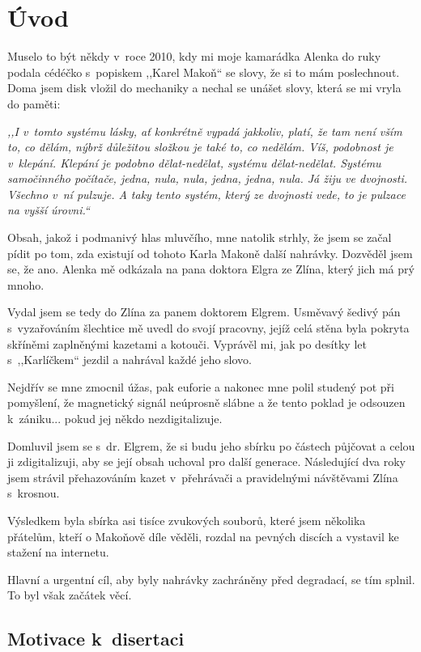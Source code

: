 \chapter{Úvod}
\label{kap:uvod}

Muselo to být někdy v~roce 2010, kdy mi moje kamarádka Alenka do ruky podala
cédéčko s~popiskem ,,Karel Makoň`` se slovy, že si to mám poslechnout. Doma jsem
disk vložil do mechaniky a nechal se unášet slovy, která se mi vryla do paměti:

{\em ,,I v~tomto systému lásky, ať konkrétně vypadá jakkoliv, platí, že tam není
vším to, co dělám, nýbrž důležitou složkou je také to, co nedělám. Víš,
podobnost je v~klepání. Klepání je podobno dělat-nedělat, systému dělat-nedělat.
Systému samočinného počítače, jedna, nula, nula, jedna, jedna, nula. Já
žiju ve dvojnosti. Všechno v~ní pulzuje. A taky tento systém, který ze dvojnosti
vede, to je pulzace na vyšší úrovni.``}

Obsah, jakož i podmanivý hlas mluvčího, mne natolik strhly, že jsem se začal
pídit po tom, zda existují od tohoto Karla Makoně další nahrávky. Dozvěděl jsem
se, že ano. Alenka mě odkázala na pana doktora Elgra ze Zlína, který jich má
prý mnoho.

Vydal jsem se tedy do Zlína za panem doktorem Elgrem. Usměvavý šedivý pán
s~vyzařováním šlechtice mě uvedl do svojí pracovny, jejíž celá stěna byla
pokryta skříněmi zaplněnými kazetami a kotouči. Vyprávěl mi, jak po desítky let
s~,,Karlíčkem`` jezdil a nahrával každé jeho slovo.

Nejdřív se mne zmocnil úžas, pak euforie a nakonec mne polil studený pot při
pomyšlení, že magnetický signál neúprosně slábne a že tento poklad je odsouzen
k~zániku... pokud jej někdo nezdigitalizuje.

Domluvil jsem se s~dr. Elgrem, že si budu jeho sbírku po částech půjčovat a celou ji
zdigitalizuji, aby se její obsah uchoval pro další generace. Následující dva
roky jsem strávil přehazováním kazet v~přehrávači a pravidelnými návštěvami
Zlína s~krosnou.

Výsledkem byla sbírka asi tisíce zvukových souborů, které jsem několika přátelům,
kteří o Makoňově díle věděli, rozdal na pevných discích a vystavil ke stažení na
internetu.

Hlavní a urgentní cíl, aby byly nahrávky zachráněny před degradací, se tím
splnil. To byl však začátek věcí.

\section{Motivace k~disertaci}

